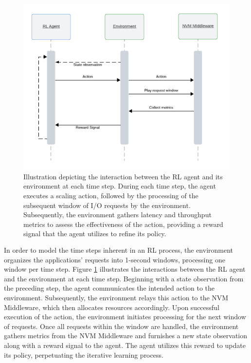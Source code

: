 \begin{figure}[ht]
  \centering
  \includegraphics[width=1\textwidth]{images/rl_sequence_flow.png}
  \caption[Reinforcement Learning Agent Process Flow]{Illustration depicting the interaction between the RL agent and its environment at each time step. During each time step, the agent executes a scaling action, followed by the processing of the subsequent window of I/O requests by the environment. Subsequently, the environment gathers latency and throughput metrics to assess the effectiveness of the action, providing a reward signal that the agent utilizes to refine its policy.}
  \label{fig:rl_sequence_flow}
\end{figure}

In order to model the time steps inherent in an RL process, the environment organizes the applications' requests into 1-second windows, processing one window per time step. Figure \ref{fig:rl_sequence_flow} illustrates the interactions between the RL agent and the environment at each time step. Beginning with a state observation from the preceding step, the agent communicates the intended action to the environment. Subsequently, the environment relays this action to the NVM Middleware, which then allocates resources accordingly. Upon successful execution of the action, the environment initiates processing for the next window of requests. Once all requests within the window are handled, the environment gathers metrics from the NVM Middleware and furnishes a new state observation along with a reward signal to the agent. The agent utilizes this reward to update its policy, perpetuating the iterative learning process.

